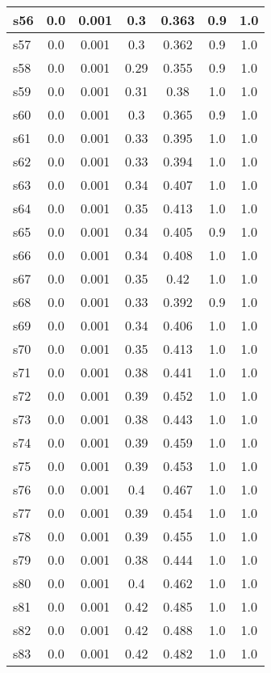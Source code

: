 \documentclass{article}
\begin{document}
\begin{tabular}{|l|c|c|c|c|c|c|}
\hline
s56 &0.0 & 0.001 & 0.3 & 0.363 & 0.9 & 1.0\\
\hline
s57 &0.0 & 0.001 & 0.3 & 0.362 & 0.9 & 1.0\\
\hline
s58 &0.0 & 0.001 & 0.29 & 0.355 & 0.9 & 1.0\\
\hline
s59 &0.0 & 0.001 & 0.31 & 0.38 & 1.0 & 1.0\\
\hline
s60 &0.0 & 0.001 & 0.3 & 0.365 & 0.9 & 1.0\\
\hline
s61 &0.0 & 0.001 & 0.33 & 0.395 & 1.0 & 1.0\\
\hline
s62 &0.0 & 0.001 & 0.33 & 0.394 & 1.0 & 1.0\\
\hline
s63 &0.0 & 0.001 & 0.34 & 0.407 & 1.0 & 1.0\\
\hline
s64 &0.0 & 0.001 & 0.35 & 0.413 & 1.0 & 1.0\\
\hline
s65 &0.0 & 0.001 & 0.34 & 0.405 & 0.9 & 1.0\\
\hline
s66 &0.0 & 0.001 & 0.34 & 0.408 & 1.0 & 1.0\\
\hline
s67 &0.0 & 0.001 & 0.35 & 0.42 & 1.0 & 1.0\\
\hline
s68 &0.0 & 0.001 & 0.33 & 0.392 & 0.9 & 1.0\\
\hline
s69 &0.0 & 0.001 & 0.34 & 0.406 & 1.0 & 1.0\\
\hline
s70 &0.0 & 0.001 & 0.35 & 0.413 & 1.0 & 1.0\\
\hline
s71 &0.0 & 0.001 & 0.38 & 0.441 & 1.0 & 1.0\\
\hline
s72 &0.0 & 0.001 & 0.39 & 0.452 & 1.0 & 1.0\\
\hline
s73 &0.0 & 0.001 & 0.38 & 0.443 & 1.0 & 1.0\\
\hline
s74 &0.0 & 0.001 & 0.39 & 0.459 & 1.0 & 1.0\\
\hline
s75 &0.0 & 0.001 & 0.39 & 0.453 & 1.0 & 1.0\\
\hline
s76 &0.0 & 0.001 & 0.4 & 0.467 & 1.0 & 1.0\\
\hline
s77 &0.0 & 0.001 & 0.39 & 0.454 & 1.0 & 1.0\\
\hline
s78 &0.0 & 0.001 & 0.39 & 0.455 & 1.0 & 1.0\\
\hline
s79 &0.0 & 0.001 & 0.38 & 0.444 & 1.0 & 1.0\\
\hline
s80 &0.0 & 0.001 & 0.4 & 0.462 & 1.0 & 1.0\\
\hline
s81 &0.0 & 0.001 & 0.42 & 0.485 & 1.0 & 1.0\\
\hline
s82 &0.0 & 0.001 & 0.42 & 0.488 & 1.0 & 1.0\\
\hline
s83 &0.0 & 0.001 & 0.42 & 0.482 & 1.0 & 1.0\\
\hline

\end{tabular}
\end{document}
